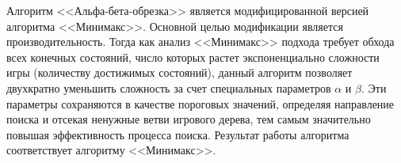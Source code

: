 Алгоритм <<Альфа-бета-обрезка>> является модифицированной версией алгоритма <<Минимакс>>. Основной целью модификации является производительность. Тогда как анализ <<Минимакс>> подхода требует обхода всех конечных состояний, число которых растет экспоненциально сложности игры (количеству достижимых состояний), данный алгоритм позволяет двухкратно уменьшить сложность за счет специальных параметров $\alpha$ и $\beta$. Эти параметры сохраняются в качестве пороговых значений, определяя направление поиска и отсекая ненужные ветви игрового дерева, тем самым значительно повышая эффективность процесса поиска. Результат работы алгоритма соответствует алгоритму <<Минимакс>>.
